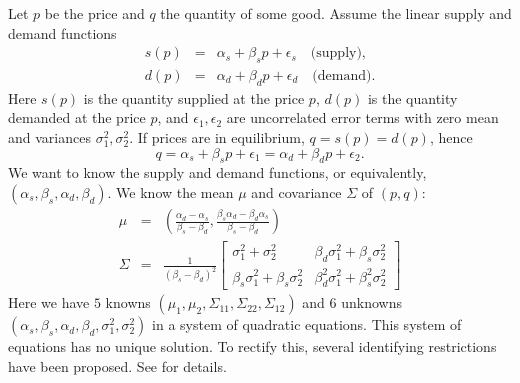 \begin{example}
 Let $p$ be the price and $q$ the quantity of some good. Assume
the linear supply and demand functions
\begin{eqnarray*}
s(p) & = & \alpha_{s}+\beta_{s}p+\epsilon_{s}\quad\textrm{(supply)},\\
d(p) & = & \alpha_{d}+\beta_{d}p+\epsilon_{d}\quad\textrm{(demand).}
\end{eqnarray*}
Here $s(p)$ is the quantity supplied at the price $p$, $d(p)$ is
the quantity demanded at the price $p$, and $\epsilon_{1},\epsilon_{2}$
are uncorrelated error terms with zero mean and variances $\sigma_{1}^{2},\sigma_{2}^{2}$.
If prices are in equilibrium, $q=s(p)=d(p)$, hence
\[
q=\alpha_{s}+\beta_{s}p+\epsilon_{1}=\alpha_{d}+\beta_{d}p+\epsilon_{2}.
\]
We want to know the supply and demand functions, or equivalently,
$(\alpha_{s},\beta_{s},\alpha_{d},\beta_{d})$. We know the mean $\mu$
and covariance $\Sigma$ of $(p,q)$:
\begin{eqnarray*}
\mu & = & \left(\frac{\alpha_{d}-\alpha_{s}}{\beta_{s}-\beta_{d}},\frac{\beta_{s}\alpha_{d}-\beta_{d}\alpha_{s}}{\beta_{s}-\beta_{d}}\right)\\
\Sigma & = & \frac{1}{(\beta_{s}-\beta_{d})^{2}}\left[\begin{array}{cc}
\sigma_{1}^{2}+\sigma_{2}^{2} & \beta_{d}\sigma_{1}^{2}+\beta_{s}\sigma_{2}^{2}\\
\beta_{s}\sigma_{1}^{2}+\beta_{s}\sigma_{2}^{2} & \beta_{d}^{2}\sigma_{1}^{2}+\beta_{s}^{2}\sigma_{2}^{2}
\end{array}\right]
\end{eqnarray*}
Here we have $5$ knowns $(\mu_{1},\mu_{2},\Sigma_{11},\Sigma_{22},\Sigma_{12})$
and $6$ unknowns $(\alpha_{s},\beta_{s},\alpha_{d},\beta_{d},\sigma_{1}^{2},\sigma_{2}^{2})$
in a system of quadratic equations. This system of equations has no
unique solution. To rectify this, several identifying restrictions have been proposed. See \textcite[Chapter 6]{Manski1999-ab} for details.
\end{example}